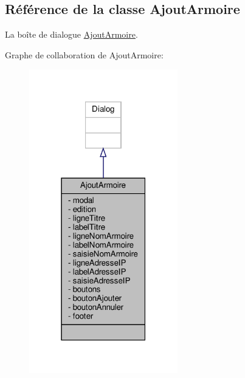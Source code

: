 \hypertarget{class_ajout_armoire}{}\subsection{Référence de la classe Ajout\+Armoire}
\label{class_ajout_armoire}


La boîte de dialogue \hyperlink{class_ajout_armoire}{Ajout\+Armoire}.  




Graphe de collaboration de Ajout\+Armoire\+:\nopagebreak
\begin{figure}[H]
\begin{center}
\leavevmode
\includegraphics[width=183pt]{class_ajout_armoire__coll__graph}
\end{center}
\end{figure}
